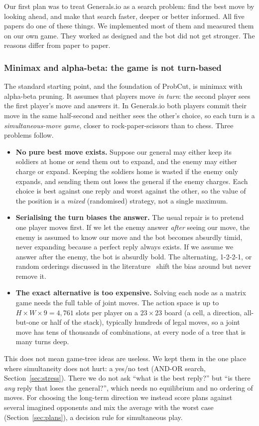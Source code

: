 Our first plan was to treat Generals.io as a search problem: find the best move by looking ahead, and make that
search faster, deeper or better informed. All five papers do one of these things. We implemented most of them
and measured them on our own game. They worked as designed and the bot did not get stronger. The reasons differ
from paper to paper.

\subsubsection{Minimax and alpha-beta: the game is not turn-based}

The standard starting point, and the foundation of ProbCut, is minimax with alpha-beta pruning. It assumes that
players move \emph{in turn}: the second player sees the first player's move and answers it. In Generals.io both
players commit their move in the same half-second and neither sees the other's choice, so each turn is a
\emph{simultaneous-move game}, closer to rock-paper-scissors than to chess. Three problems follow.
\begin{itemize}
\item \textbf{No pure best move exists.} Suppose our general may either keep its soldiers at home or send them
out to expand, and the enemy may either charge or expand. Keeping the soldiers home is wasted if the enemy only
expands, and sending them out loses the general if the enemy charges. Each choice is best against one reply and
worst against the other, so the value of the position is a \emph{mixed} (randomised) strategy, not a single
maximum.
\item \textbf{Serialising the turn biases the answer.} The usual repair is to pretend one player moves first.
If we let the enemy answer \emph{after} seeing our move, the enemy is assumed to know our move and the bot
becomes absurdly timid, never expanding because a perfect reply always exists. If we assume we answer after the
enemy, the bot is absurdly bold. The alternating, 1-2-2-1, or random orderings discussed in the
literature~\cite{barriga} shift the bias around but never remove it.
\item \textbf{The exact alternative is too expensive.} Solving each node as a matrix game needs the full table
of joint moves. The action space is up to $H\times W\times 9=4{,}761$ slots per player on a $23\times 23$ board
(a cell, a direction, all-but-one or half of the stack), typically hundreds of legal moves, so a joint move has
tens of thousands of combinations, at every node of a tree that is many turns deep.
\end{itemize}
This does not mean game-tree ideas are useless. We kept them in the one place where simultaneity does not hurt:
a yes/no test (AND-OR search, Section~\ref{sec:stress}). There we do not ask ``what is the best reply?'' but
``is there \emph{any} reply that loses the general?'', which needs no equilibrium and no ordering of moves. For
choosing the long-term direction we instead score plans against several imagined opponents and mix the average
with the worst case (Section~\ref{sec:plans}), a decision rule for simultaneous play.


